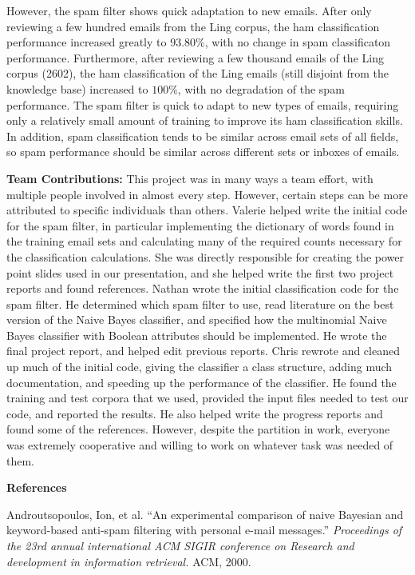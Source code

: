 \documentclass[12pt]{article}
\begin{document}
	However, the spam filter shows quick adaptation to new emails.  After only reviewing a few hundred emails from the Ling corpus, the ham classification performance increased greatly to $93.80\%$, with no change in spam classificaton performance.  Furthermore, after reviewing a few thousand emails of the Ling corpus (2602), the ham classification of the Ling emails (still disjoint from the knowledge base) increased to $100\%$, with no degradation of the spam performance.  The spam filter is quick to adapt to new types of emails, requiring only a relatively small amount of training to improve its ham classification skills.  In addition, spam classification tends to be similar across email sets of all fields, so spam performance should be similar across different sets or inboxes of emails.  
	
 
 \textbf{Team Contributions:} This project was in many ways a team effort, with multiple people
 involved in almost every step.  However, certain steps can be more attributed to specific individuals
 than others.  Valerie helped write the initial code for the spam filter, in particular implementing the 
 dictionary of words found in the training email sets and calculating many of the required counts 
 necessary for the classification calculations.  She was directly responsible for creating the power
 point slides used in our presentation, and she helped write the first two project reports and found
 references.  Nathan wrote the initial classification code for the spam filter.  He determined which
 spam filter to use, read literature on the best version of the Naive Bayes classifier, and 
 specified how the multinomial Naive Bayes classifier with Boolean attributes should be implemented.
 He wrote the final project report, and helped edit previous reports.  Chris rewrote and cleaned up
 much of the initial code, giving the classifier a class structure, adding much documentation, and 
 speeding up the performance of the classifier.  He found the training and test corpora that we used,
 provided the input files needed to test our code, and reported the results.  He also helped write the 
 progress reports and found some of the references.  However, despite the partition in work, everyone
 was extremely cooperative and willing to work on whatever task was needed of them.

\begin{flushleft}
\textbf{References}
\end{flushleft}

\begin{flushleft}
Androutsopoulos, Ion, et al.  ``An experimental comparison of naive Bayesian and keyword-based anti-spam filtering with personal e-mail messages.'' \textit{Proceedings of the 23rd annual international ACM SIGIR conference on Research and development in information retrieval.} ACM, 2000.
\end{flushleft}
\end{document}
